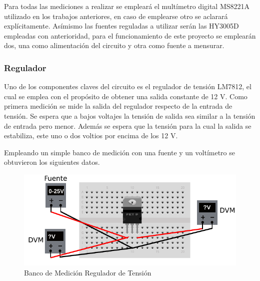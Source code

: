\documentclass[12pt,a4paper]{article}
\begin{document}
			Para todas las mediciones a realizar se empleará el multímetro digital MS8221A utilizado en los trabajos anteriores, en caso de emplearse otro se aclarará explícitamente. Asímismo las fuentes reguladas a utilizar serán las HY3005D empleadas con anterioridad, para el funcionamiento de este proyecto se emplearán dos, una como alimentación del circuito y otra como fuente a mensurar.

			\subsubsection{Regulador}

			Uno de los componentes claves del circuito es el regulador de tensión LM7812, el cual se emplea con el propósito de obtener una salida constante de 12 V. Como primera medición se mide la salida del regulador respecto de la entrada de tensión. Se espera que a bajos voltajes la tensión de salida sea similar a la tensión de entrada pero menor. Además se espera que la tensión para la cual la salida se estabiliza, este uno o dos voltios por encima de los 12 V.

			Empleando un simple banco de medición con una fuente y un voltímetro se obtuvieron los siguientes datos.

			\begin{figure}[H]
			\centering
				\includegraphics[scale=1]{images/reg.pdf}\caption{Banco de Medición Regulador de Tensión}\label{fig:banco0}
			\end{figure}
\end{document}
